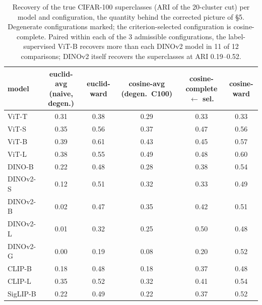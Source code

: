\begin{table}[H]
\centering
\scriptsize
\begin{tabular}{lccccc}
\toprule
model & euclid-avg (naive, degen.) & euclid-ward & cosine-avg (degen.\ C100) & cosine-complete $\leftarrow$ sel. & cosine-ward \\
\midrule
ViT-T & 0.31 & 0.38 & 0.29 & 0.33 & 0.33 \\
ViT-S & 0.35 & 0.56 & 0.37 & 0.47 & 0.56 \\
ViT-B & 0.39 & 0.61 & 0.43 & 0.45 & 0.57 \\
ViT-L & 0.38 & 0.55 & 0.49 & 0.48 & 0.60 \\
DINO-B & 0.22 & 0.48 & 0.28 & 0.38 & 0.54 \\
DINOv2-S & 0.12 & 0.51 & 0.32 & 0.33 & 0.49 \\
DINOv2-B & 0.02 & 0.47 & 0.35 & 0.42 & 0.51 \\
DINOv2-L & 0.01 & 0.32 & 0.25 & 0.50 & 0.48 \\
DINOv2-G & 0.00 & 0.19 & 0.08 & 0.20 & 0.52 \\
CLIP-B & 0.18 & 0.48 & 0.18 & 0.37 & 0.48 \\
CLIP-L & 0.35 & 0.52 & 0.32 & 0.41 & 0.54 \\
SigLIP-B & 0.22 & 0.49 & 0.22 & 0.37 & 0.52 \\
\bottomrule
\end{tabular}
\caption{Recovery of the true CIFAR-100 superclasses (ARI of the 20-cluster cut) per model and configuration, the quantity behind the corrected picture of \S5. Degenerate configurations marked; the criterion-selected configuration is cosine-complete. Paired within each of the 3 admissible configurations, the label-supervised ViT-B recovers more than each DINOv2 model in 11 of 12 comparisons; DINOv2 itself recovers the superclasses at ARI 0.19--0.52.}
\label{tab:b11-recovery}
\end{table}
